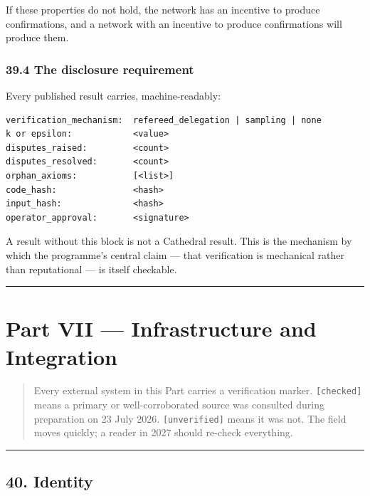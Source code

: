\documentclass[
  11pt]{report}
\begin{document}
If these properties do not hold, the network has an incentive to produce
confirmations, and a network with an incentive to produce confirmations
will produce them.

\hypertarget{the-disclosure-requirement}{%
\section{39.4 The disclosure
requirement}\label{the-disclosure-requirement}}

Every published result carries, machine-readably:

\begin{verbatim}
verification_mechanism:  refereed_delegation | sampling | none
k or epsilon:            <value>
disputes_raised:         <count>
disputes_resolved:       <count>
orphan_axioms:           [<list>]
code_hash:               <hash>
input_hash:              <hash>
operator_approval:       <signature>
\end{verbatim}

A result without this block is not a Cathedral result. This is the
mechanism by which the programme's central claim --- that verification
is mechanical rather than reputational --- is itself checkable.

\begin{center}\rule{0.5\linewidth}{0.5pt}\end{center}

\hypertarget{part-vii-infrastructure-and-integration}{%
\part{Part VII --- Infrastructure and
Integration}\label{part-vii-infrastructure-and-integration}}

\begin{quote}
Every external system in this Part carries a verification marker.
\texttt{{[}checked{]}} means a primary or well-corroborated source was
consulted during preparation on 23 July 2026. \texttt{{[}unverified{]}}
means it was not. The field moves quickly; a reader in 2027 should
re-check everything.
\end{quote}

\begin{center}\rule{0.5\linewidth}{0.5pt}\end{center}

\hypertarget{identity}{%
\chapter{40. Identity}\label{identity}}
\end{document}
